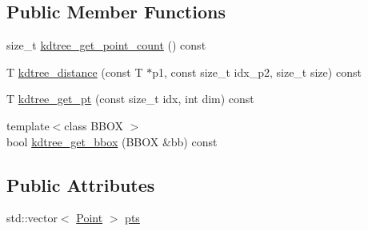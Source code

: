 \subsection*{Public Member Functions}
\begin{DoxyCompactItemize}
\item 
size\-\_\-t \hyperlink{struct_point_cloud_ad42c3e3433189cf208b3fb022833311e}{kdtree\-\_\-get\-\_\-point\-\_\-count} () const 
\item 
T \hyperlink{struct_point_cloud_aac37c2ee10973779c95bb348607a6580}{kdtree\-\_\-distance} (const T $\ast$p1, const size\-\_\-t idx\-\_\-p2, size\-\_\-t size) const 
\item 
T \hyperlink{struct_point_cloud_a058d08d08d1f1014807f7dc34c94f940}{kdtree\-\_\-get\-\_\-pt} (const size\-\_\-t idx, int dim) const 
\item 
{\footnotesize template$<$class B\-B\-O\-X $>$ }\\bool \hyperlink{struct_point_cloud_a2893ba0826a85d81cd51503796879417}{kdtree\-\_\-get\-\_\-bbox} (B\-B\-O\-X \&bb) const 
\end{DoxyCompactItemize}
\subsection*{Public Attributes}
\begin{DoxyCompactItemize}
\item 
std\-::vector$<$ \hyperlink{struct_point_cloud_1_1_point}{Point} $>$ \hyperlink{struct_point_cloud_a32dd1acf311134fb9582be30cdc7e07f}{pts}
\end{DoxyCompactItemize}


